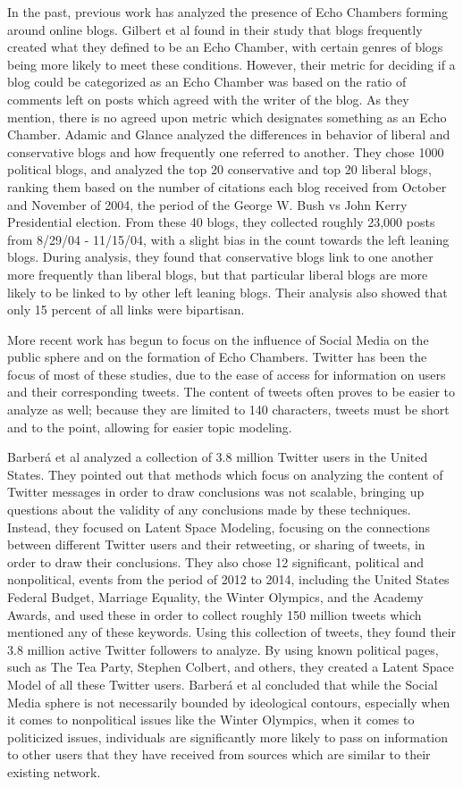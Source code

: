 \documentclass[journal]{IEEEtran}
\begin{document}
	In the past, previous work has analyzed the presence of Echo Chambers forming around online blogs. Gilbert et al found in their study that blogs frequently created what they defined to be an Echo Chamber, with certain genres of blogs being more likely to meet these conditions. However, their metric for deciding if a blog could be categorized as an Echo Chamber was based on the ratio of comments left on posts which agreed with the writer of the blog. As they mention, there is no agreed upon metric which designates something as an Echo Chamber. Adamic and Glance analyzed the differences in behavior of liberal and conservative blogs and how frequently one referred to another. They chose 1000 political blogs, and analyzed the top 20 conservative and top 20 liberal blogs, ranking them based on the number of citations each blog received from October and November of 2004, the period of the George W. Bush vs John Kerry Presidential election. From these 40 blogs, they collected roughly 23,000 posts from 8/29/04 - 11/15/04, with a slight bias in the count towards the left leaning blogs. During analysis, they found that conservative blogs link to one another more frequently than liberal blogs, but that particular liberal blogs are more likely to be linked to by other left leaning blogs. Their analysis also showed that only 15 percent of all links were bipartisan. 
	
	More recent work has begun to focus on the influence of Social Media on the public sphere and on the formation of Echo Chambers. Twitter has been the focus of most of these studies, due to the ease of access for information on users and their corresponding tweets. The content of tweets often proves to be easier to analyze as well; because they are limited to 140 characters, tweets must be short and to the point, allowing for easier topic modeling. 
	
	Barberá et al analyzed a collection of 3.8 million Twitter users in the United States. They pointed out that methods which focus on analyzing the content of Twitter messages in order to draw conclusions was not scalable, bringing up questions about the validity of any conclusions made by these techniques. Instead, they focused on Latent Space Modeling, focusing on the connections between different Twitter users and their retweeting, or sharing of tweets, in order to draw their conclusions. They also chose 12 significant, political and nonpolitical, events from the period of 2012 to 2014, including the United States Federal Budget, Marriage Equality, the Winter Olympics, and the Academy Awards, and used these in order to collect roughly 150 million tweets which mentioned any of these keywords. Using this collection of tweets, they found their 3.8 million active Twitter followers to analyze. By using known political pages, such as The Tea Party, Stephen Colbert, and others, they created a Latent Space Model of all these Twitter users.  Barberá et al concluded that while the Social Media sphere is not necessarily bounded by ideological contours, especially when it comes to nonpolitical issues like the Winter Olympics, when it comes to politicized issues, individuals are significantly more likely to pass on information to other users that they have received from sources which are similar to their existing network. 
	
\end{document}
